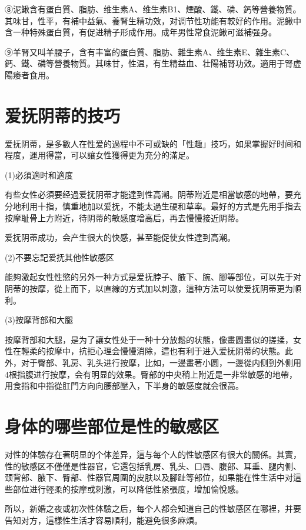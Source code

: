 \documentclass[12pt,UTF8]{ctexbook}
\begin{document}
⑧泥鳅含有蛋白質、脂肪、维生素A、维生素B1、煙酸、鐵、磷、鈣等營養物質。其味甘，性平，有補中益氣、養腎生精功效，对调节性功能有較好的作用。泥鳅中含一种特殊蛋白質，有促进精子形成作用。成年男性常食泥鳅可滋補强身。

⑨羊腎又叫羊腰子，含有丰富的蛋白質、脂肪、雜生素A、维生素E、雜生素C、鈣、鐵、磷等營養物質。其味甘，性温，有生精益血、壮陽補腎功效。適用于腎虚陽痿者食用。

\section{爱抚阴蒂的技巧}

爱抚阴蒂，是多數人在性爱的過程中不可或缺的「性趣」技巧，如果掌握好时间和程度，運用得當，可以讓女性獲得更为充分的滿足。

(1)必須適时和適度

有些女性必須要经過爱抚阴蒂才能達到性高潮。阴蒂附近是相當敏感的地帶，要充分地利用十指，慎重地加以爱抚，不能太過生硬和草率。最好的方式是先用手指去按摩耻骨上方附近，待阴蒂的敏感度增高后，再去慢慢接近阴蒂。

爱抚阴蒂成功，会产生很大的快感，甚至能促使女性達到高潮。

(2)不要忘記爱抚其他性敏感区

能夠激起女性性慾的另外一种方式是爱抚脖子、腋下、腕、腳等部位，可以先于对阴蒂的按摩，從上而下，以直線的方式加以刺激，這种方法可以使爱抚阴蒂更为順利。

(3)按摩背部和大腿

按摩背部和大腿，是为了讓女性处于一种十分放鬆的状態，像畫圆畫似的搓揉，女性在輕柔的按摩中，抗拒心理会慢慢消除，這也有利于进入爱抚阴蒂的状態。此外，对于臀部、乳房、乳头进行按摩，比如，一邊畫著小圆，一邊從内侧到外侧用4根指腹进行按摩，会有明显的效果。臀部的中央稍上附近是一非常敏感的地帶，用食指和中指從肛門方向向腰部壓入，下半身的敏感度就会很高。

\section{身体的哪些部位是性的敏感区}

对性的体驗存在著明显的个体差异，這与每个人的性敏感区有很大的關係。其實，性的敏感区不僅僅是性器官，它還包括乳房、乳头、口唇、腹部、耳垂、腿内侧、颈背部、腋下、臀部、性器官周圍的皮肤以及腳趾等部位，如果能在性生活中对這些部位进行輕柔的按摩或刺激，可以降低性紧張度，增加愉悅感。

所以，新婚之夜或初次性体驗之后，每个人都会知道自己的性敏感区在哪裡，并要告知对方，這樣性生活才容易順利，能避免很多麻煩。
\end{document}
